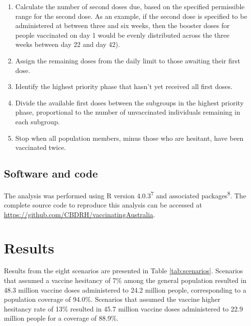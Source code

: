 \documentclass{article}
\begin{document}
\begin{enumerate}
\def\labelenumi{\arabic{enumi}.}
\item
  Calculate the number of second doses due, based on the specified
  permissible range for the second dose. As an example, if the second
  dose is specified to be administered at between three and six weeks,
  then the booster doses for people vaccinated on day 1 would be evenly
  distributed across the three weeks between day 22 and day 42).
\item
  Assign the remaining doses from the daily limit to those awaiting
  their first dose.
\item
  Identify the highest priority phase that hasn't yet received all first
  doses.
\item
  Divide the available first doses between the subgroups in the highest
  priority phase, proportional to the number of unvaccinated individuals
  remaining in each subgroup.
\item
  Stop when all population members, minus those who are hesitant, have
  been vaccinated twice.
\end{enumerate}

\hypertarget{software-and-code}{%
\subsection{Software and code}\label{software-and-code}}

The analysis was performed using R version 4.0.3\textsuperscript{7} and
associated packages\textsuperscript{8}. The complete source code to
reproduce this analysis can be accessed at
\url{https://github.com/CBDRH/vaccinatingAustralia}.

\hypertarget{results}{%
\section{Results}\label{results}}

Results from the eight scenarios are presented in Table
\ref{tab:scenarios}. Scenarios that assumed a vaccine hesitancy of 7\%
among the general population resulted in 48.3 million vaccine doses
administered to 24.2 million people, corresponding to a population
coverage of 94.0\%. Scenarios that assumed the vaccine higher hesitancy
rate of 13\% resulted in 45.7 million vaccine doses administered to 22.9
million people for a coverage of 88.9\%.
\end{document}
